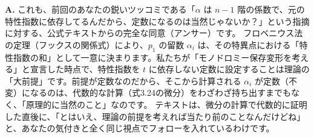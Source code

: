 \begin{Q}
\textbf{A.} これも、前回のあなたの鋭いツッコミである「$\alpha$ は $n-1$ 階の係数で、元の特性指数に依存してるんだから、定数になるのは当然じゃないか？」という指摘に対する、公式テキストからの完全な同意（アンサー）です。
フロベニウス法の定理（フックスの関係式）により、$p_1$ の留数 $\alpha_i$ は、その特異点における「特性指数の和」として一意に決まります。私たちが「モノドロミー保存変形を考える」と宣言した時点で、特性指数を $t$ に依存しない定数に設定することは理論の「大前提」です。前提が定数なのだから、そこから計算される $\alpha_i$ が定数（不変）になるのは、代数的な計算（式3.24の微分）をわざわざ持ち出すまでもなく、「原理的に当然のこと」なのです。
テキストは、微分の計算で代数的に証明した直後に、「とはいえ、理論の前提を考えれば当たり前のことなんだけどね」と、あなたの気付きと全く同じ視点でフォローを入れているわけです。
\end{Q}

